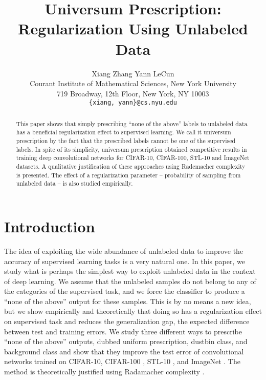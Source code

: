 \documentclass[letterpaper]{article}
\begin{document}
\title{Universum Prescription: Regularization Using Unlabeled Data}
\author{
Xiang Zhang \qquad Yann LeCun \\
Courant Institute of Mathematical Sciences, New York University \\
719 Broadway, 12th Floor, New York, NY 10003 \\
\texttt{\{xiang, yann\}@cs.nyu.edu} \\
}
\maketitle

\begin{abstract}
This paper shows that simply prescribing ``none of the above'' labels to unlabeled data has a beneficial regularization effect to supervised learning. We call it universum prescription by the fact that the prescribed labels cannot be one of the supervised labels. In spite of its simplicity, universum prescription obtained competitive results in training deep convolutional networks for CIFAR-10, CIFAR-100, STL-10 and ImageNet datasets. A qualitative justification of these approaches using Rademacher complexity is presented. The effect of a regularization parameter -- probability of sampling from unlabeled data -- is also studied empirically.
\end{abstract}

\section{Introduction}

The idea of exploiting the wide abundance of unlabeled data to improve the accuracy of supervised learning tasks is a very natural one. In this paper, we study what is perhaps the simplest way to exploit unlabeled data in the context of deep learning. We assume that the unlabeled samples do not belong to any of the categories of the supervised task, and we force the classifier to produce a ``none of the above'' output for these samples. This is by no means a new idea, but we show empirically and theoretically that doing so has a regularization effect on supervised task and reduces the generalization gap, the expected difference between test and training errors. We study three different ways to prescribe ``none of the above'' outputs, dubbed uniform prescription, dustbin class, and background class and show that they improve the test error of convolutional networks trained on CIFAR-10, CIFAR-100 \cite{K09}, STL-10 \cite{ANL11}, and ImageNet \cite{RDSKSMHKKBBF15}. The method is theoretically justified using Radamacher complexity \cite{BM03}.
\end{document}
